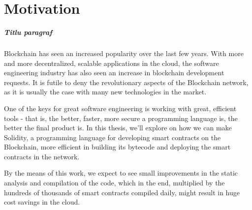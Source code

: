 \chapter*{Motivation} 

\paragraph*{Titlu paragraf}
Blockchain has seen an increased popularity over the last few years.
With more and more decentralized, scalable applications in the cloud, the software engineering industry has also seen an increase in blockchain development requests.
It is futile to deny the revolutionary aspects of the Blockchain network, as it is usually the case with many new technologies in the market.

One of the keys for great software engineering is working with great, efficient tools - that is, the better, faster, more secure a programming language is, the better the final product is.
In this thesis, we'll explore on how we can make Solidity, a programming language for developing smart contracts on the Blockchain, more efficient in building its bytecode and deploying the smart contracts in the network.

By the means of this work, we expect to see small improvements in the static analysis and compilation of the code, which in the end, multiplied by the hundreds of thousands of smart contracts compiled daily, might result in huge cost savings in the cloud.

